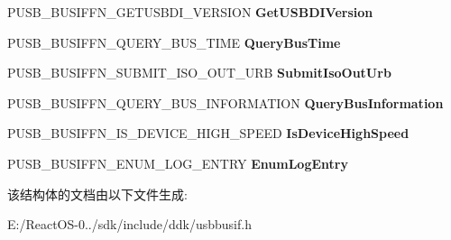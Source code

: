 \begin{DoxyCompactItemize}
P\+U\+S\+B\+\_\+\+B\+U\+S\+I\+F\+F\+N\+\_\+\+G\+E\+T\+U\+S\+B\+D\+I\+\_\+\+V\+E\+R\+S\+I\+ON {\bfseries Get\+U\+S\+B\+D\+I\+Version}
\item 
\mbox{\label{struct___u_s_b___b_u_s___i_n_t_e_r_f_a_c_e___u_s_b_d_i___v2_a360350928b00a0f6e9dcfb9d23c5819b}} 
P\+U\+S\+B\+\_\+\+B\+U\+S\+I\+F\+F\+N\+\_\+\+Q\+U\+E\+R\+Y\+\_\+\+B\+U\+S\+\_\+\+T\+I\+ME {\bfseries Query\+Bus\+Time}
\item 
\mbox{\label{struct___u_s_b___b_u_s___i_n_t_e_r_f_a_c_e___u_s_b_d_i___v2_a6ed00643e9e9286416b37b75415a23bb}} 
P\+U\+S\+B\+\_\+\+B\+U\+S\+I\+F\+F\+N\+\_\+\+S\+U\+B\+M\+I\+T\+\_\+\+I\+S\+O\+\_\+\+O\+U\+T\+\_\+\+U\+RB {\bfseries Submit\+Iso\+Out\+Urb}
\item 
\mbox{\label{struct___u_s_b___b_u_s___i_n_t_e_r_f_a_c_e___u_s_b_d_i___v2_af42f7acd0cf854ff9895dd2f0402aa39}} 
P\+U\+S\+B\+\_\+\+B\+U\+S\+I\+F\+F\+N\+\_\+\+Q\+U\+E\+R\+Y\+\_\+\+B\+U\+S\+\_\+\+I\+N\+F\+O\+R\+M\+A\+T\+I\+ON {\bfseries Query\+Bus\+Information}
\item 
\mbox{\label{struct___u_s_b___b_u_s___i_n_t_e_r_f_a_c_e___u_s_b_d_i___v2_a05694a585aaf2820d1c24e41ee31be10}} 
P\+U\+S\+B\+\_\+\+B\+U\+S\+I\+F\+F\+N\+\_\+\+I\+S\+\_\+\+D\+E\+V\+I\+C\+E\+\_\+\+H\+I\+G\+H\+\_\+\+S\+P\+E\+ED {\bfseries Is\+Device\+High\+Speed}
\item 
\mbox{\label{struct___u_s_b___b_u_s___i_n_t_e_r_f_a_c_e___u_s_b_d_i___v2_a5c9413645a4ac668967311cc0adae254}} 
P\+U\+S\+B\+\_\+\+B\+U\+S\+I\+F\+F\+N\+\_\+\+E\+N\+U\+M\+\_\+\+L\+O\+G\+\_\+\+E\+N\+T\+RY {\bfseries Enum\+Log\+Entry}
\end{DoxyCompactItemize}


该结构体的文档由以下文件生成\+:\begin{DoxyCompactItemize}
\item 
E\+:/\+React\+O\+S-\/0../sdk/include/ddk/usbbusif.\+h\end{DoxyCompactItemize}
